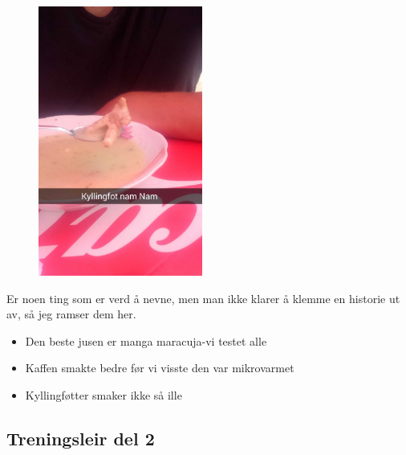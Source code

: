 \begin{figure}[h]
	\begin{center}
	\includegraphics[width=0.48\textwidth]{kyllingfot}
	\caption*{}
\end{center}
\end{figure}



Er noen ting som er verd å nevne, men man ikke klarer å klemme en
historie ut av, så jeg ramser dem her.

\begin{itemize}
	\item Den beste jusen er manga maracuja-vi testet
			alle
		\item Kaffen smakte bedre før vi visste den var
			mikrovarmet
		\item Kyllingføtter smaker ikke så ille
\end{itemize}


\subsection*{Treningsleir del 2}

